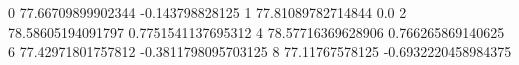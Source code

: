 0 77.66709899902344 -0.143798828125
1 77.81089782714844 0.0
2 78.58605194091797 0.7751541137695312
4 78.57716369628906 0.766265869140625
6 77.42971801757812 -0.3811798095703125
8 77.11767578125 -0.6932220458984375
